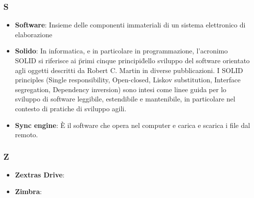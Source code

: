 \subsubsection{S}
\begin{itemize}
	\item \textbf{Software}: Insieme delle componenti immateriali di un sistema elettronico di elaborazione
	\item \textbf{Solido}: In informatica, e in particolare in programmazione, l'acronimo SOLID si riferisce ai \"primi cinque principi\" dello sviluppo del software orientato agli oggetti descritti da Robert C. Martin in diverse pubblicazioni. I SOLID principles (Single responsibility, Open-closed, Liskov substitution, Interface segregation, Dependency inversion) sono intesi come linee guida per lo sviluppo di software leggibile, estendibile e mantenibile, in particolare nel contesto di pratiche di sviluppo agili.
	\item \textbf{Sync engine}: È il software che opera nel computer e carica e scarica i file dal remoto.
\end{itemize}

\subsubsection{Z}
\begin{itemize}
	\item \textbf{Zextras Drive}:
	\item \textbf{Zimbra}:
\end{itemize}
